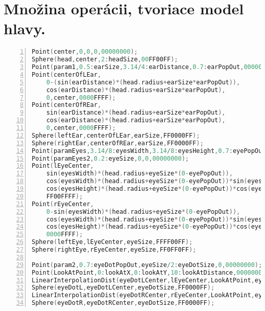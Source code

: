\chapter{Množina operácii, tvoriace model hlavy.}
\label{mnozinaoperacii}
\begin{lstlisting}[language=C,frame=tb,numbers=left]
Point(center,0,0,0,00000000);
Sphere(head,center,2:headSize,00FF00FF);
Point(param1,0.5:earSize,3.14/4:earDistance,0.7:earPopOut,00000000);
Point(centerOfLEar,
	0-(sin(earDistance)*(head.radius+earSize*earPopOut)),
	cos(earDistance)*(head.radius+earSize*earPopOut),
	0,center,0000FFFF);
Point(centerOfREar,
	sin(earDistance)*(head.radius+earSize*earPopOut),
	cos(earDistance)*(head.radius+earSize*earPopOut),
	0,center,0000FFFF);
Sphere(leftEar,centerOfLEar,earSize,FF0000FF);
Sphere(rightEar,centerOfREar,earSize,FF0000FF);
Point(paramEyes,3.14/8:eyesWidth,3.14/8:eyesHeight,0.7:eyePopOut,00000000);
Point(paramEyes2,0.2:eyeSize,0,0,00000000);
Point(lEyeCenter,
	sin(eyesWidth)*(head.radius+eyeSize*(0-eyePopOut)),
	cos(eyesWidth)*(head.radius+eyeSize*(0-eyePopOut))*sin(eyesHeight),
	cos(eyesHeight)*(head.radius+eyeSize*(0-eyePopOut))*cos(eyesWidth),
	FF00FFFF);
Point(rEyeCenter,
	0-sin(eyesWidth)*(head.radius+eyeSize*(0-eyePopOut)),
	cos(eyesWidth)*(head.radius+eyeSize*(0-eyePopOut))*sin(eyesHeight),
	cos(eyesHeight)*(head.radius+eyeSize*(0-eyePopOut))*cos(eyesWidth),
	0000FFFF);
Sphere(leftEye,lEyeCenter,eyeSize,FFFF00FF);
Sphere(rightEye,rEyeCenter,eyeSize,FF0FF0FF);

Point(param2,0.7:eyeDotPopOut,eyeSize/2:eyeDotSize,0,00000000);
Point(LookAtPoint,0:lookAtX,0:lookAtY,10:lookAtDistance,00000000);
LinearInterpolationDist(eyeDotLCenter,lEyeCenter,LookAtPoint,eyeSize-eyeDotSize*eyeDotPopOut,00000000);
Sphere(eyeDotL,eyeDotLCenter,eyeDotSize,FF0000FF);
LinearInterpolationDist(eyeDotRCenter,rEyeCenter,LookAtPoint,eyeSize-eyeDotSize*eyeDotPopOut,00000000);
Sphere(eyeDotR,eyeDotRCenter,eyeDotSize,FF0000FF);
\end{lstlisting}{}